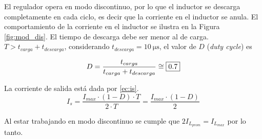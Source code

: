 \begin{itemize}

		El regulador opera en modo discontinuo, por lo que el inductor se descarga completamente en cada ciclo, es decir que la corriente en el inductor se anula. El comportamiento de la corriente en el inductor se ilustra en la Figura \ref{fig:mod_dis}. El tiempo de descarga debe ser menor al de carga. $T > t_{carga} + t_{descarga}$, considerando $t_{descarga} = \SI{10}{\micro\second}$, el valor de $D$ (\textit{duty cycle}) es 

		\begin{equation}
			\centering
			D = \frac{t_{carga}}{t_{carga} + t_{descarga}} \cong \boxed{\num{0,7}}
		\end{equation}
		

\end{itemize}




%
%
%
%
%

La corriente de salida está dada por \eqref{ec:is}.
\begin{equation}
	I_s = \frac{I_{max} \cdot (1-D) \cdot T}{2 \cdot T} = \frac{I_{max} \cdot (1 - D)}{2} 
	\label{ec:is}
\end{equation}

Al estar trabajando en modo discontinuo se cumple que $ 2 I_{L_{prom}} =I_{L_{max}} $ por lo tanto.


